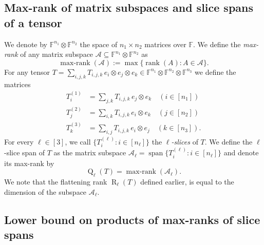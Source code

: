 \documentclass[11pt]{article}
\DeclareMathOperator{\subrank}{Q}
\DeclareMathOperator{\tensorrank}{R}
\newcommand{\FF}{\mathbb{F}}
\DeclareMathOperator{\linspan}{span}
\DeclareMathOperator{\rank}{rank} \DeclareMathOperator{\col}{colspan}
\DeclareMathOperator{\maxrank}{max-rank}
\begin{document}
\subsection{Max-rank of matrix subspaces and slice spans of a tensor}\label{subsec:maxrank}

%
    We denote by $\FF^{n_1} \otimes \FF^{n_2}$ the space of $n_1 \times n_2$ matrices over $\FF$.
    We define the \emph{max-rank} of any matrix subspace $\mathcal{A} \subseteq \FF^{n_1} \otimes \FF^{n_2}$ as
    \[
\maxrank(\mathcal{A}):=\max\{\rank(A):A\in\mathcal{A}\}.
    \]
%
%
For any tensor $T = \sum_{i,j,k} T_{i,j,k}\, e_i \otimes e_j \otimes e_k \in \FF^{n_1} \otimes \FF^{n_2} \otimes \FF^{n_3}$ we define the matrices %
%
%
%
%
%
%
\begin{align*}
T^{(1)}_i &= \sum_{j,k} T_{i,j,k}\, e_j \otimes e_k \quad (i \in [n_1])\\
T^{(2)}_j &= \sum_{i,k} T_{i,j,k}\, e_i \otimes e_k \quad (j \in [n_2])\\
T^{(3)}_k &= \sum_{i,j} T_{i,j,k}\, e_i \otimes e_j \quad (k \in [n_3]).
\end{align*}
For every $\ell \in [3]$, we call $\{T^{(\ell)}_i : i \in [n_\ell] \}$ the \emph{$\ell$-slices} of $T$. %
%
%
%
%
%
%
%
%
%
%
%
%
%
%
%
%
%
%
%
%
%
%
%
%
%
%
%
%
%
%
%
%
%
%
%
%
%
%
%
%
%
%
We define the $\ell$-slice span of $T$ as the matrix subspace
$\mathcal{A}_\ell = \linspan \{T^{(\ell)}_i : i \in [n_\ell] \}$
and denote its max-rank by
\[
\subrank_\ell(T) = \maxrank(\mathcal{A}_\ell).
\]
%
%
We note that the flattening rank $\tensorrank_\ell(T)$ defined earlier, is equal to the dimension of the subspace $\mathcal{A}_\ell$. 

%



%
%



%
%

%
%
%
%
%
%
%
%

%
%
%

%
%
%
%
%
%
%
%
%
%
%
%
%
%
%
%

%

%
%
%
%
%
%
%
%
%
%
%
%
%




\subsection{Lower bound on products of max-ranks of slice spans}\label{subsec:QiQj}

%
\end{document}
